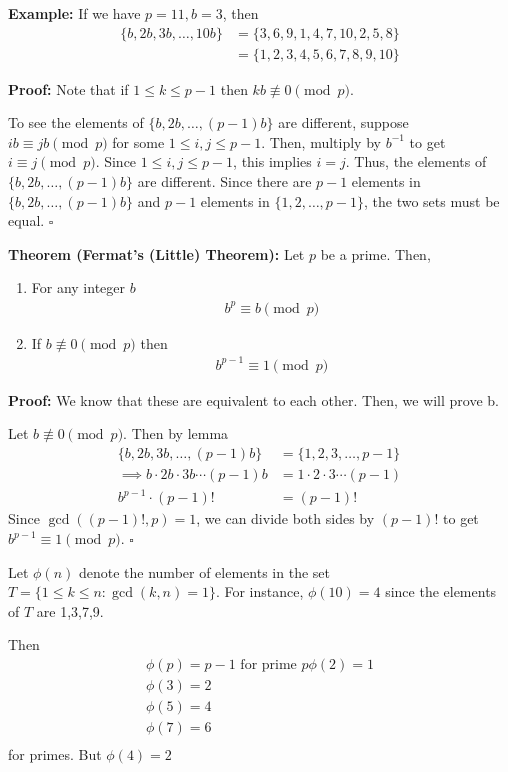 \documentclass{article}
\newcommand*{\qed}{\hfill$\square$}%
\begin{document}
\textbf{Example:} If we have $p=11, b=3$, then \begin{align*}
    \{b, 2b, 3b, \dots, 10b\} &=\{3, 6, 9, 1, 4, 7, 10, 2, 5, 8\}\\
    &=\{1, 2, 3, 4, 5, 6, 7, 8, 9, 10\}
\end{align*}

\textbf{Proof:} Note that if $1\leq k\leq p-1$ then $kb\not\equiv 0\pmod p$.

To see the elements of $\{b, 2b, \dots, (p-1)b\}$ are different, suppose $ib\equiv jb\pmod p$ for some $1\leq i,j\leq p-1$. Then, multiply by $b^{-1}$ to get $i\equiv j\pmod p$. Since $1\leq i,j\leq p-1$, this implies $i=j$. Thus, the elements of $\{b, 2b, \dots, (p-1)b\}$ are different. Since there are $p-1$ elements in $\{b, 2b, \dots, (p-1)b\}$ and $p-1$ elements in $\{1, 2, \dots, p-1\}$, the two sets must be equal. \qed

\textbf{Theorem (Fermat's (Little) Theorem):} Let $p$ be a prime. Then, \begin{enumerate}
    \item For any integer $b$ \begin{align*}
        b^p\equiv b\pmod p
    \end{align*}
    \item If $b\not\equiv 0\pmod p$ then \begin{align*}
        b^{p-1}\equiv 1\pmod p
    \end{align*}
\end{enumerate} 

\textbf{Proof:} We know that these are equivalent to each other. Then, we will prove b. 

Let $b\not\equiv 0\pmod p$. Then by lemma \begin{align*}
    \{b, 2b, 3b, \dots, (p-1)b\} &=\{1, 2, 3, \dots, p-1\}\\
    \implies b\cdot 2b\cdot 3b\cdots (p-1)b&=1\cdot 2\cdot 3\cdots (p-1)\\
    b^{p-1}\cdot (p-1)!&=(p-1)!
\end{align*}Since $\gcd((p-1)!, p)=1$, we can divide both sides by $(p-1)!$ to get $b^{p-1}\equiv 1\pmod p$. \qed

Let $\phi(n)$ denote the number of elements in the set $T=\{1\leq k\leq n: \gcd(k,n)=1\}$. For instance, $\phi(10)=4$ since the elements of $T$ are 1,3,7,9.

Then \begin{align*}
    \phi(p)=p-1\text{ for prime } p
    \phi(2)=1\\
    \phi(3)=2\\
    \phi(5)=4\\
    \phi(7)=6\\
\end{align*}for primes. But $\phi(4)=2$
\end{document}

